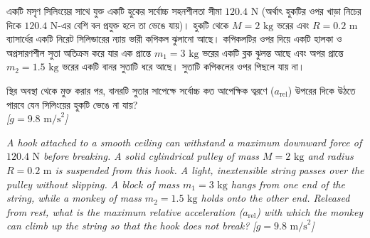 \documentclass[12pt, a4paper]{article}
\begin{document}
\newpage


\begin{tcolorbox}[questionbox={প্রশ্ন (Question) 4}]
\noindent
একটি মসৃণ সিলিংয়ের সাথে যুক্ত একটি হুকের সর্বোচ্চ সহনশীলতা সীমা $120.4\text{ N}$ (অর্থাৎ হুকটির ওপর খাড়া নিচের দিকে $120.4\text{ N}$-এর বেশি বল প্রযুক্ত হলে তা ভেঙে যায়)। হুকটি থেকে $M = 2\text{ kg}$ ভরের এবং $R = 0.2\text{ m}$ ব্যাসার্ধের একটি নিরেট সিলিন্ডারের ন্যায় ভারী কপিকল ঝুলানো আছে। কপিকলটির ওপর দিয়ে একটি হালকা ও অপ্রসারণশীল সুতা অতিক্রম করে যার এক প্রান্তে $m_1 = 3\text{ kg}$ ভরের একটি ব্লক ঝুলন্ত আছে এবং অপর প্রান্তে $m_2 = 1.5\text{ kg}$ ভরের একটি বানর সুতাটি ধরে আছে। সুতাটি কপিকলের ওপর পিছলে যায় না। 

\vspace{0.3em}
\noindent
স্থির অবস্থা থেকে মুক্ত করার পর, বানরটি সুতার সাপেক্ষে সর্বোচ্চ কত আপেক্ষিক ত্বরণে ($a_{\text{rel}}$) উপরের দিকে উঠতে পারবে যেন সিলিংয়ের হুকটি ভেঙে না যায়? \\
\textit{[$g = 9.8\text{ m/s}^2$]}

\vspace{0.8em}
\begin{english}
\noindent\textit{\color{darkgray}
A hook attached to a smooth ceiling can withstand a maximum downward force of $120.4\text{ N}$ before breaking. A solid cylindrical pulley of mass $M = 2\text{ kg}$ and radius $R = 0.2\text{ m}$ is suspended from this hook. A light, inextensible string passes over the pulley without slipping. A block of mass $m_1 = 3\text{ kg}$ hangs from one end of the string, while a monkey of mass $m_2 = 1.5\text{ kg}$ holds onto the other end. Released from rest, what is the maximum relative acceleration ($a_{\text{rel}}$) with which the monkey can climb up the string so that the hook does not break? [$g = 9.8\text{ m/s}^2$]
}
\end{english}
\end{tcolorbox}
\end{document}
